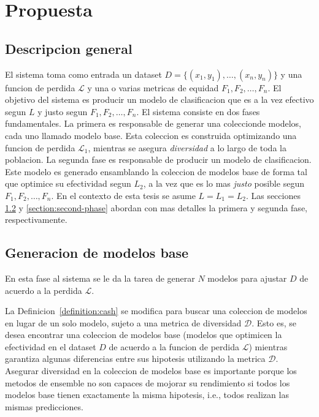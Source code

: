 \chapter{Propuesta}\label{chapter:proposal}

\section{Descripcion general}\label{section:overview}

El sistema toma como entrada un dataset $D = \{(x_1, y_1), \dots , (x_n, y_n)\}$ y una funcion de perdida $\mathcal{L}$ y una o varias metricas de equidad $F_1, F_2, \dots, F_n$. El objetivo del sistema es producir un modelo de clasificacion que es a la vez efectivo segun $L$ y justo segun $F_1, F_2, \dots, F_n$. El sistema consiste en dos fases fundamentales. La primera es responsable de generar una coleccionde modelos, cada uno llamado modelo base. Esta coleccion es construida optimizando una funcion de perdida $\mathcal{L}_1$, mientras se asegura \emph{diversidad} a lo largo de toda la poblacion. La segunda fase es responsable de producir un modelo de clasificacion. Este modelo es generado ensamblando la coleccion de modelos base de forma tal que optimice su efectividad segun $L_2$, a la vez que es lo mas \emph{justo} posible segun $F_1, F_2, \dots, F_n$. En el contexto de esta tesis se asume $L = L_1 = L_2$. Las secciones \ref{section:first-phase} y \ref{section:second-phase} abordan con mas detalles la primera y segunda fase, respectivamente.


\section{Generacion de modelos base}\label{section:first-phase}


En esta fase al sistema se le da la tarea de generar $N$ modelos para ajustar $D$ de acuerdo a la perdida $\mathcal{L}$.

La Definicion~\ref{definition:cash} se modifica para buscar una coleccion de modelos en lugar de un solo modelo, sujeto a una metrica de diversidad $\mathcal{D}$. Esto es, se desea encontrar una coleccion de modelos base (modelos que optimicen la efectividad en el dataset $D$ de acuerdo a la funcion de perdida $\mathcal{L}$) mientras garantiza algunas diferencias entre sus hipotesis utilizando la metrica $\mathcal{D}$. Asegurar diversidad en la coleccion de modelos base es importante porque los metodos de ensemble no son capaces de mojorar su rendimiento si todos los modelos base tienen exactamente la misma hipotesis, i.e., todos realizan las mismas predicciones.

